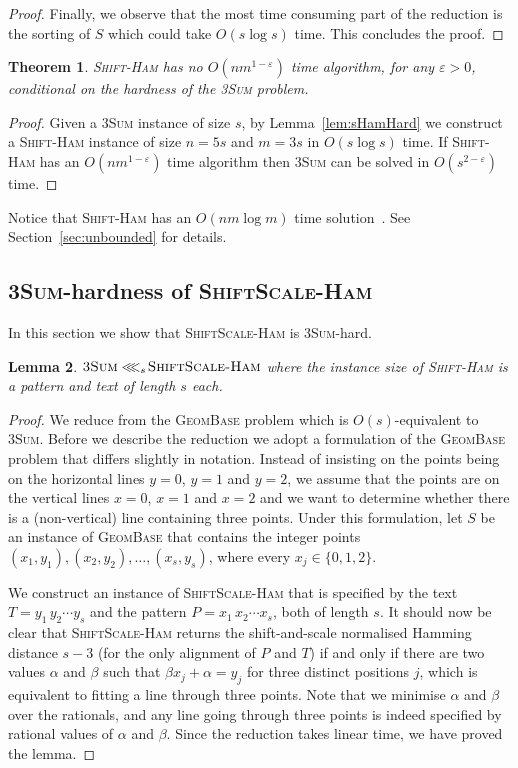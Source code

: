 \documentclass[11pt]{article}
\renewcommand{\epsilon}{\varepsilon}
\newcommand{\sHam}{\textsc{Shift-Ham}\xspace}
\newcommand{\ssHam}{\textsc{ShiftScale-Ham}\xspace}
\newcommand{\threeSUM}{\textsc{3Sum}\xspace}
\newcommand{\geombase}{\textsc{GeomBase}\xspace}
\newcommand{\freduce}[1]{\ensuremath{\lll_{#1}\!}}
\theoremstyle{plain}
\newtheorem{theorem}{Theorem}[]
\newtheorem{lemma}[theorem]{Lemma}
\theoremstyle{definition}
\begin{document}
\begin{proof}
    Finally, we observe that the most time consuming part of the reduction is the sorting of $S$ which could take $O(s\log s)$ time. This concludes the proof.
\end{proof}

\begin{theorem}
    \label{thm:sHamLower}
    \sHam has no $O(nm^{1-\epsilon})$ time algorithm, for any $\epsilon>0$, conditional on the hardness of the \threeSUM problem.
\end{theorem}
\begin{proof}
    Given a \threeSUM instance of size $s$, by Lemma~\ref{lem:sHamHard} we construct a \sHam instance of size $n=5s$ and $m=3s$ in $O(s\log s)$ time. If \sHam has an $O(nm^{1-\epsilon})$ time algorithm then \threeSUM can be solved in $O(s^{2-\epsilon})$ time.
\end{proof}


Notice that \sHam has an $O(nm\log m)$ time solution~\cite{MNU:2005}. See Section~\ref{sec:unbounded} for details.


\subsection{\threeSUM-hardness of \ssHam}

In this section we show that \ssHam is \threeSUM-hard.

\begin{lemma}
    \label{lem:ssHamHard}
    $\threeSUM\freduce{s}\ssHam$ where the instance size of \sHam is a pattern and text of length $s$ each.
\end{lemma}
\begin{proof}
    We reduce from the \geombase problem which is $O(s)$-equivalent to \threeSUM. Before we describe the reduction we adopt a formulation of the \geombase problem that differs slightly in notation. Instead of insisting on the points being on the horizontal lines $y=0$, $y=1$ and $y=2$, we assume that the points are on the vertical lines $x=0$, $x=1$ and $x=2$ and we want to determine whether there is a (non-vertical) line containing three points. Under this formulation, let $S$ be an instance of \geombase that contains the integer points $(x_1,y_1), (x_2,y_2), \dots, (x_s,y_s)$, where every $x_j\in\{0,1,2\}$.

    We construct an instance of \ssHam that is specified by the text $T=y_1\,y_2\cdots y_s$ and the pattern $P=x_1\,x_2\cdots x_s$, both of length $s$. It should now be clear that \ssHam returns the shift-and-scale normalised Hamming distance $s-3$ (for the only alignment of $P$ and $T$) if and only if there are two values $\alpha$ and $\beta$ such that $\beta x_j + \alpha = y_j$ for three distinct positions $j$, which is equivalent to fitting a line through three points. Note that we minimise $\alpha$ and $\beta$ over the rationals, and any line going through three points is indeed specified by rational values of $\alpha$ and $\beta$. Since the reduction takes linear time, we have proved the lemma.
\end{proof}
\end{document}
